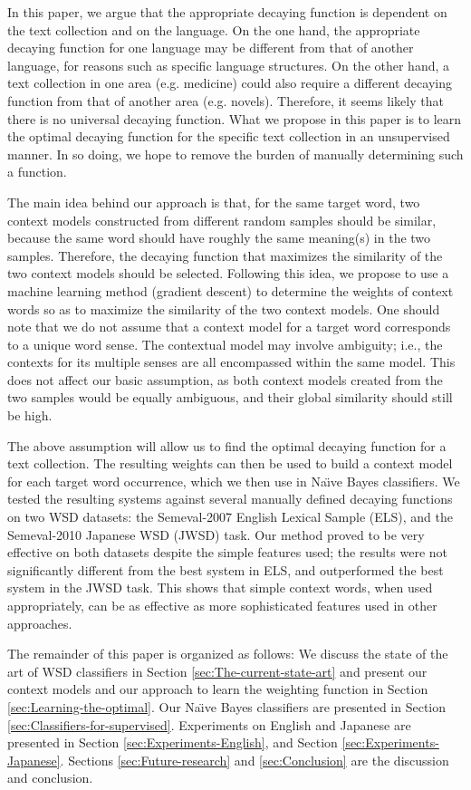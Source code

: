 \documentclass[english]{jnlp_1.4}
\begin{document}
In this paper, we argue that the appropriate decaying function is
dependent on the text collection and on the language. On the one hand,
the appropriate decaying function for one language may be different
from that of another language, for reasons such as specific language
structures. On the other hand, a text collection in one area (e.g.
medicine) could also require a different decaying function from that
of another area (e.g. novels). Therefore, it seems likely that there
is no universal decaying function. What we propose in this paper is
to learn the optimal decaying function for the specific text collection
in an unsupervised manner. In so doing, we hope to remove the burden
of manually determining such a function.

The main idea behind our approach is that, for the same target word,
two context models constructed from different random samples should
be similar, because the same word should have roughly the same meaning(s)
in the two samples. Therefore, the decaying function that maximizes
the similarity of the two context models should be selected. Following
this idea, we propose to use a machine learning method (gradient descent)
to determine the weights of context words so as to maximize the similarity
of the two context models. One should note that we do not assume that
a context model for a target word corresponds to a unique word sense.
The contextual model may involve ambiguity; i.e., the contexts for
its multiple senses are all encompassed within the same model. This
does not affect our basic assumption, as both context models created
from the two samples would be equally ambiguous, and their global
similarity should still be high. 

The above assumption will allow us to find the optimal decaying function
for a text collection. The resulting weights can then be used to build
a context model for each target word occurrence, which we then use
in Na\"{\i}ve Bayes classifiers. We tested the resulting systems against
several manually defined decaying functions on two WSD datasets: the
Semeval-2007 English Lexical Sample (ELS), and the Semeval-2010 Japanese
WSD (JWSD) task. Our method proved to be very effective on both datasets
despite the simple features used; the results were not significantly
different from the best system in ELS, and outperformed the best system
in the JWSD task. This shows that simple context words, when used
appropriately, can be as effective as more sophisticated features
used in other approaches. 

The remainder of this paper is organized as follows:
We discuss the state of the art of WSD classifiers in Section \ref{sec:The-current-state-art}
and present our context models and our approach to learn the weighting
function in Section \ref{sec:Learning-the-optimal}. Our Na\"{\i}ve
Bayes classifiers are presented in Section \ref{sec:Classifiers-for-supervised}.
Experiments on English and Japanese are presented in Section \ref{sec:Experiments-English},
and Section \ref{sec:Experiments-Japanese}. Sections \ref{sec:Future-research}
and \ref{sec:Conclusion} are the discussion and conclusion. 
\end{document}
